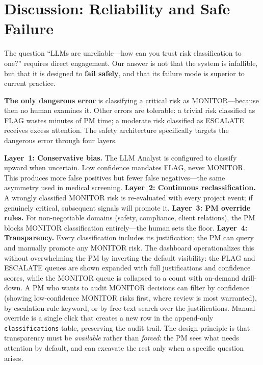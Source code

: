 \documentclass[runningheads]{llncs}
\begin{document}
\section{Discussion: Reliability and Safe Failure}
\label{sec:discussion}

The question ``LLMs are unreliable---how can you trust risk classification to one?'' requires direct engagement. Our answer is not that the system is infallible, but that it is designed to \textbf{fail safely}, and that its failure mode is superior to current practice.

\textbf{The only dangerous error} is classifying a critical risk as MONITOR---because then no human examines it. Other errors are tolerable: a trivial risk classified as FLAG wastes minutes of PM time; a moderate risk classified as ESCALATE receives excess attention. The safety architecture specifically targets the dangerous error through four layers.

\textbf{Layer~1: Conservative bias.} The LLM Analyst is configured to classify upward when uncertain. Low confidence mandates FLAG, never MONITOR. This produces more false positives but fewer false negatives---the same asymmetry used in medical screening. \textbf{Layer~2: Continuous reclassification.} A wrongly classified MONITOR risk is re-evaluated with every project event; if genuinely critical, subsequent signals will promote it. \textbf{Layer~3: PM override rules.} For non-negotiable domains (safety, compliance, client relations), the PM blocks MONITOR classification entirely---the human sets the floor. \textbf{Layer~4: Transparency.} Every classification includes its justification; the PM can query and manually promote any MONITOR risk. The dashboard operationalizes this without overwhelming the PM by inverting the default visibility: the FLAG and ESCALATE queues are shown expanded with full justifications and confidence scores, while the MONITOR queue is collapsed to a count with on-demand drill-down. A PM who wants to audit MONITOR decisions can filter by confidence (showing low-confidence MONITOR risks first, where review is most warranted), by escalation-rule keyword, or by free-text search over the justifications. Manual override is a single click that creates a new row in the append-only \texttt{classifications} table, preserving the audit trail. The design principle is that transparency must be \emph{available} rather than \emph{forced}: the PM sees what needs attention by default, and can excavate the rest only when a specific question arises.
\end{document}
